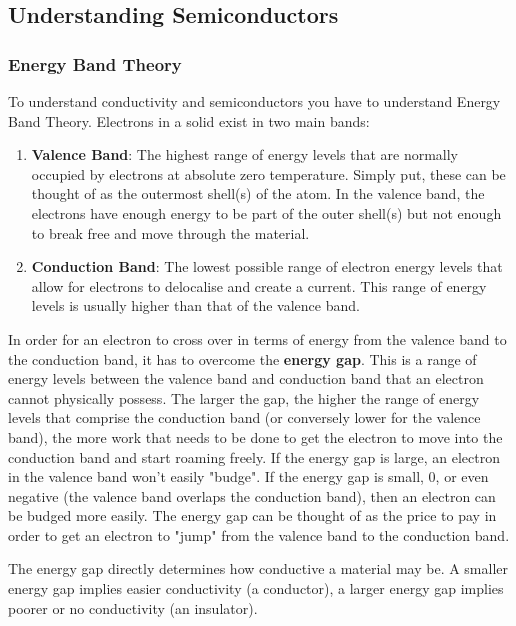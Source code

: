 \documentclass{article}
\begin{document}
\subsection{Understanding Semiconductors}

\subsubsection{Energy Band Theory}

To understand conductivity and semiconductors you have to understand Energy Band Theory. Electrons in a solid exist in two main bands:

\begin{enumerate}
    \item \textbf{Valence Band}: The highest range of energy levels that are normally occupied by electrons at absolute zero temperature. Simply put, these can be thought of as the outermost shell(s) of the atom. In the valence band, the electrons have enough energy to be part of the outer shell(s) but not enough to break free and move through the material.
    \item \textbf{Conduction Band}: The lowest possible range of electron energy levels that allow for electrons to delocalise and create a current. This range of energy levels is usually higher than that of the valence band.
\end{enumerate}

In order for an electron to cross over in terms of energy from the valence band to the conduction band, it has to overcome the \textbf{energy gap}. This is a range of energy levels between the valence band and conduction band that an electron cannot physically possess. The larger the gap, the higher the range of energy levels that comprise the conduction band (or conversely lower for the valence band), the more work that needs to be done to get the electron to move into the conduction band and start roaming freely. If the energy gap is large, an electron in the valence band won't easily "budge". If the energy gap is small, 0, or even negative (the valence band overlaps the conduction band), then an electron can be budged more easily. The energy gap can be thought of as the price to pay in order to get an electron to "jump" from the valence band to the conduction band. 

The energy gap directly determines how conductive a material may be. A smaller energy gap implies easier conductivity (a conductor), a larger energy gap implies poorer or no conductivity (an insulator).
\end{document}
